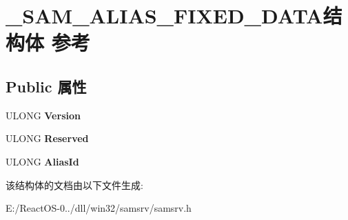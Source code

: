 \hypertarget{struct___s_a_m___a_l_i_a_s___f_i_x_e_d___d_a_t_a}{}\section{\+\_\+\+S\+A\+M\+\_\+\+A\+L\+I\+A\+S\+\_\+\+F\+I\+X\+E\+D\+\_\+\+D\+A\+T\+A结构体 参考}
\label{struct___s_a_m___a_l_i_a_s___f_i_x_e_d___d_a_t_a}
\subsection*{Public 属性}
\begin{DoxyCompactItemize}
\item 
\mbox{\label{struct___s_a_m___a_l_i_a_s___f_i_x_e_d___d_a_t_a_a05e613e22edcc0141729dd096739648b}} 
U\+L\+O\+NG {\bfseries Version}
\item 
\mbox{\label{struct___s_a_m___a_l_i_a_s___f_i_x_e_d___d_a_t_a_a037019039f3e27471b41318d904de46f}} 
U\+L\+O\+NG {\bfseries Reserved}
\item 
\mbox{\label{struct___s_a_m___a_l_i_a_s___f_i_x_e_d___d_a_t_a_af671f2a576fd594cd8b7858e9d85a658}} 
U\+L\+O\+NG {\bfseries Alias\+Id}
\end{DoxyCompactItemize}


该结构体的文档由以下文件生成\+:\begin{DoxyCompactItemize}
\item 
E\+:/\+React\+O\+S-\/0../dll/win32/samsrv/samsrv.\+h\end{DoxyCompactItemize}
